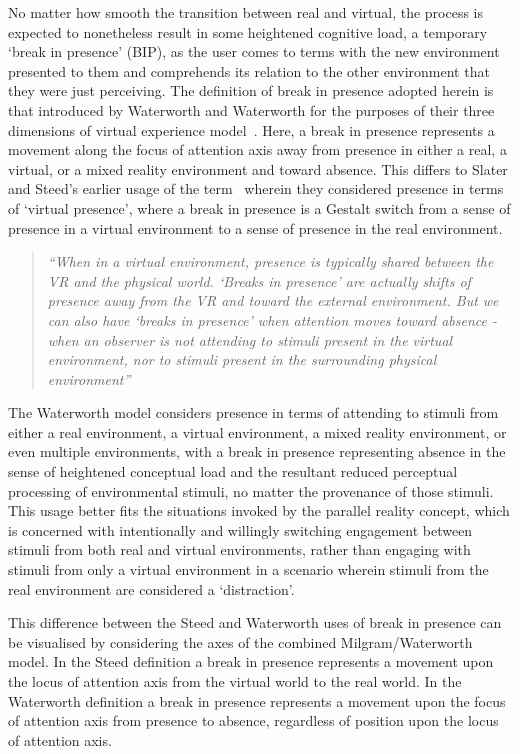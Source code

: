 No matter how smooth the transition between real and virtual, the process is expected to nonetheless result in some heightened cognitive load, a temporary `break in presence' (BIP), as the user comes to terms with the new environment presented to them and comprehends its relation to the other environment that they were just perceiving. The definition of break in presence adopted herein is that introduced by Waterworth and Waterworth for the purposes of their three dimensions of virtual experience model~\cite{Waterworth2001}. Here, a break in presence represents a movement along the focus of attention axis away from presence in either a real, a virtual, or a mixed reality environment and toward absence. This differs to Slater and Steed's earlier usage of the term~\cite{Slater2000} wherein they considered presence in terms of `virtual presence', where a break in presence is a Gestalt switch from a sense of presence in a virtual environment to a sense of presence in the real environment.

\begin{quote}
	\textit{``When in a virtual environment, presence is typically shared between the VR and the physical world. `Breaks in presence' are actually shifts of presence away from the VR and toward the external environment. But we can also have `breaks in presence' when attention moves toward absence - when an observer is not attending to stimuli present in the virtual environment, nor to stimuli present in the surrounding physical environment''}~\cite{Waterworth2001}
\end{quote}

The Waterworth model considers presence in terms of attending to stimuli from either a real environment, a virtual environment, a mixed reality environment, or even multiple environments, with a break in presence representing absence in the sense of heightened conceptual load and the resultant reduced perceptual processing of environmental stimuli, no matter the provenance of those stimuli. This usage better fits the situations invoked by the parallel reality concept, which is concerned with intentionally and willingly switching engagement between stimuli from both real and virtual environments, rather than engaging with stimuli from only a virtual environment in a scenario wherein stimuli from the real environment are considered a `distraction'.

This difference between the Steed and Waterworth uses of break in presence can be visualised by considering the axes of the combined Milgram/Waterworth model. In the Steed definition a break in presence represents a movement upon the locus of attention axis from the virtual world to the real world. In the Waterworth definition a break in presence represents a movement upon the focus of attention axis from presence to absence, regardless of position upon the locus of attention axis.


